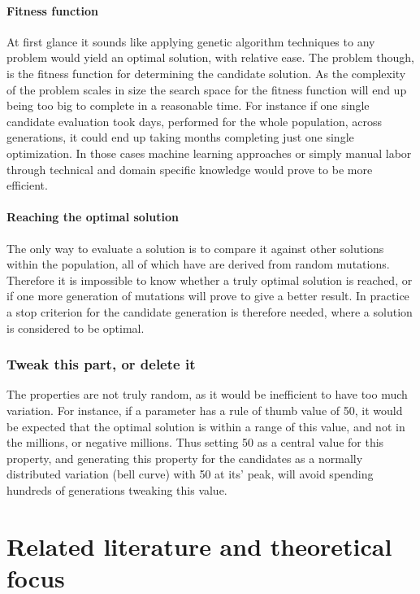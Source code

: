 \documentclass[a4paper,english]{report}
\begin{document}
					\subsubsection{Fitness function}
					At first glance it sounds like applying genetic algorithm techniques to any problem would yield an optimal solution, with relative ease. The problem though, is the fitness function for determining the candidate solution. As the complexity of the problem scales in size the search space for the fitness function will end up being too big to complete in a reasonable time. For instance if one single candidate evaluation took days, performed for the whole population, across generations, it could end up taking months completing just one single optimization. In those cases machine learning approaches or simply manual labor through technical and domain specific knowledge would prove to be more efficient.
					\subsubsection{Reaching the optimal solution}
					The only way to evaluate a solution is to compare it against other solutions within the population, all of which have are derived from random mutations. Therefore it is impossible to know whether a truly optimal solution is reached, or if one more generation of mutations will prove to give a better result. In practice a stop criterion for the candidate generation is therefore needed, where a solution is considered to be optimal.
			
				\subsection{Tweak this part, or delete it}
				The properties are not truly random, as it would be inefficient to have too much variation. For instance, if a parameter has a rule of thumb value of 50, it would be expected that the optimal solution is within a range of this value, and not in the millions, or negative millions. Thus setting 50 as a central value for this property, and generating this property for the candidates as a normally distributed variation (bell curve) with 50 at its' peak, will avoid spending hundreds of generations tweaking this value.
		
	\chapter{Related literature and theoretical focus}
\end{document}
